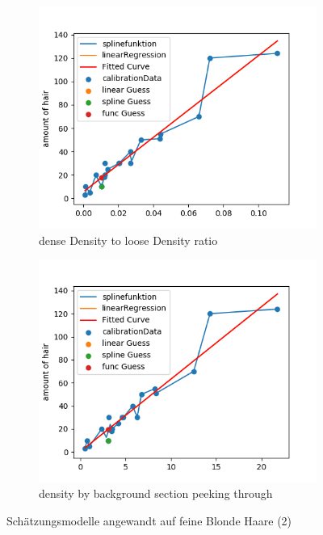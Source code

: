 \documentclass[german,a4paper, 12pt]{scrartcl}
\begin{document}
\begin{figure}[H]
	\medskip
	\begin{subfigure}{0.48\textwidth}
		\includegraphics[width=1.1\linewidth]{figBina/g11.png}
		\caption{dense Density to loose Density ratio} \label{fig:e}
	\end{subfigure}\hspace*{\fill}
	\begin{subfigure}{0.48\textwidth}
		\includegraphics[width=1.1\linewidth]{figBina/g12.png}
		\caption{density by background section peeking through} \label{fig:f}
	\end{subfigure}
	
	
	\caption{Schätzungsmodelle angewandt auf feine Blonde Haare (2)} \label{fig:1}
\end{figure}
\end{document}
